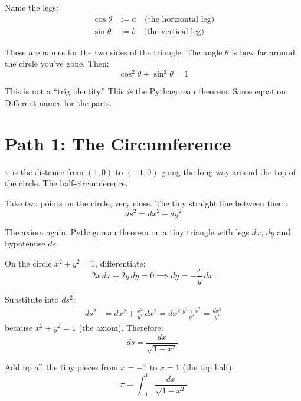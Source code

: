 \documentclass[11pt,a4paper]{article}
\theoremstyle{plain}
\theoremstyle{definition}
\begin{document}
Name the legs:
\begin{align}
  \cos\theta &:= a \quad \text{(the horizontal leg)} \\
  \sin\theta &:= b \quad \text{(the vertical leg)}
\end{align}

These are names for the two sides of the triangle.
The angle $\theta$ is how far around the circle you've gone. Then:
\begin{equation}
  \cos^2\theta + \sin^2\theta = 1
\end{equation}

This is not a ``trig identity.'' This \emph{is} the Pythagorean theorem.
Same equation. Different names for the parts.

\section{Path 1: The Circumference}

$\pi$ is the distance from $(1, 0)$ to $(-1, 0)$ going the long way
around the top of the circle. The half-circumference.

Take two points on the circle, very close. The tiny straight line between
them:
\begin{equation}
  ds^2 = dx^2 + dy^2
\end{equation}

The axiom again. Pythagorean theorem on a tiny triangle with legs $dx$, $dy$
and hypotenuse $ds$.

On the circle $x^2 + y^2 = 1$, differentiate:
\begin{equation}
  2x\,dx + 2y\,dy = 0 \implies dy = -\frac{x}{y}\,dx.
\end{equation}

Substitute into $ds^2$:
\begin{align}
  ds^2 &= dx^2 + \frac{x^2}{y^2}\,dx^2
       = dx^2\,\frac{y^2 + x^2}{y^2}
       = \frac{dx^2}{y^2}
\end{align}
because $x^2 + y^2 = 1$ (the axiom). Therefore:
\begin{equation}
  ds = \frac{dx}{\sqrt{1 - x^2}}.
\end{equation}

Add up all the tiny pieces from $x = -1$ to $x = 1$ (the top half):
\begin{equation}\label{eq:pi-integral}
  \boxed{\; \pi = \int_{-1}^{1} \frac{dx}{\sqrt{1 - x^2}} \;}
\end{equation}
\end{document}
